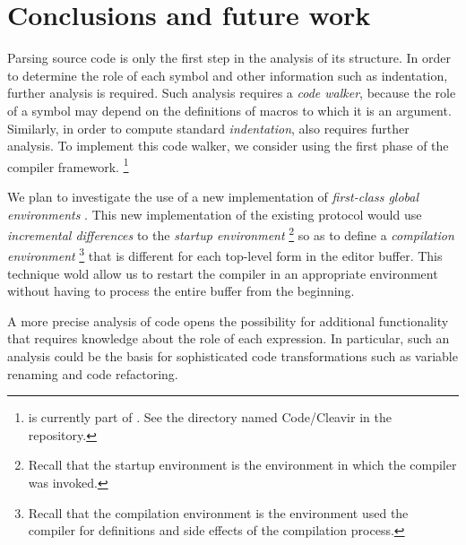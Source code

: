 \section{Conclusions and future work}

Parsing \commonlisp{} source code is only the first step in the
analysis of its structure.  In order to determine the role of each
symbol and other information such as indentation, further analysis is
required.  Such analysis requires a \emph{code walker}, because the
role of a symbol may depend on the definitions of macros to which it
is an argument.  Similarly, in order to compute standard
\emph{indentation}, also requires further analysis.  To implement this
code walker, we consider using the first phase of the \cleavir{}
compiler framework.%
\footnote{\cleavir{} is currently part of \sicl{}.  See the directory
  named Code/Cleavir in the \sicl{} repository.}

We plan to investigate the use of a new implementation of
\emph{first-class global environments}
\cite{Strandh:2015:ELS:Environments}.  This new implementation of the
existing \clos{} protocol would use \emph{incremental differences} to
the \emph{startup environment}%
\footnote{Recall that the startup environment is the environment in
  which the compiler was invoked.}
so as to define a \emph{compilation environment}%
\footnote{Recall that the compilation environment is the environment
  used the compiler for definitions and side effects of the
  compilation process.}
that is different for each top-level form in the editor buffer.  This
technique wold allow us to restart the compiler in an appropriate
environment without having to process the entire buffer from the
beginning.

A more precise analysis of \commonlisp{} code opens the
possibility for additional functionality that requires knowledge about
the role of each expression.  In particular, such an analysis could be
the basis for sophisticated code transformations such as variable
renaming and code refactoring.

